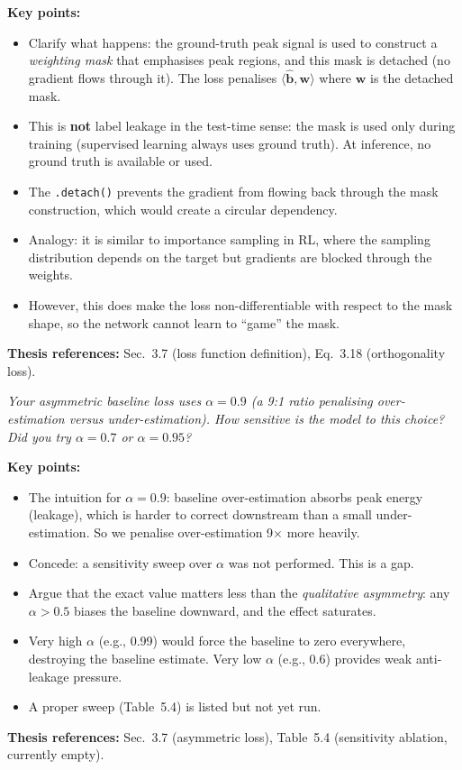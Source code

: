 \documentclass[11pt, letterpaper]{article}
\newcounter{qcounter}
\newcommand{\question}[1]{%
  \stepcounter{qcounter}%
  \begin{questionbox}[Q\theqcounter]%
    \itshape #1%
  \end{questionbox}%
}
\begin{document}
\begin{answerbox}
\textbf{Key points:}
\begin{itemize}[nosep]
  \item Clarify what happens: the ground-truth peak signal is used to
        construct a \emph{weighting mask} that emphasises peak regions,
        and this mask is detached (no gradient flows through it).
        The loss penalises $\langle \hat{\mathbf{b}}, \mathbf{w} \rangle$
        where $\mathbf{w}$ is the detached mask.
  \item This is \textbf{not} label leakage in the test-time sense:
        the mask is used only during training (supervised learning
        always uses ground truth).  At inference, no ground truth
        is available or used.
  \item The \texttt{.detach()} prevents the gradient from flowing
        back through the mask construction, which would create
        a circular dependency.
  \item Analogy: it is similar to importance sampling in RL, where
        the sampling distribution depends on the target but gradients
        are blocked through the weights.
  \item However, this does make the loss non-differentiable with
        respect to the mask shape, so the network cannot learn to
        ``game'' the mask.
\end{itemize}
\textbf{Thesis references:} Sec.~3.7 (loss function definition), Eq.~3.18 (orthogonality loss).
\end{answerbox}

\question{Your asymmetric baseline loss uses $\alpha{=}0.9$ (a 9:1 ratio
penalising over-estimation versus under-estimation).  How sensitive
is the model to this choice?  Did you try $\alpha{=}0.7$ or
$\alpha{=}0.95$?}

\begin{answerbox}
\textbf{Key points:}
\begin{itemize}[nosep]
  \item The intuition for $\alpha{=}0.9$: baseline over-estimation
        absorbs peak energy (leakage), which is harder to correct
        downstream than a small under-estimation.  So we penalise
        over-estimation 9$\times$ more heavily.
  \item Concede: a sensitivity sweep over $\alpha$ was not performed.
        This is a gap.
  \item Argue that the exact value matters less than the
        \emph{qualitative asymmetry}: any $\alpha > 0.5$ biases the
        baseline downward, and the effect saturates.
  \item Very high $\alpha$ (e.g., 0.99) would force the baseline to
        zero everywhere, destroying the baseline estimate.  Very low
        $\alpha$ (e.g., 0.6) provides weak anti-leakage pressure.
  \item A proper sweep (Table~5.4) is listed but not yet run.
\end{itemize}
\textbf{Thesis references:} Sec.~3.7 (asymmetric loss), Table~5.4 (sensitivity ablation, currently empty).
\end{answerbox}
\end{document}
